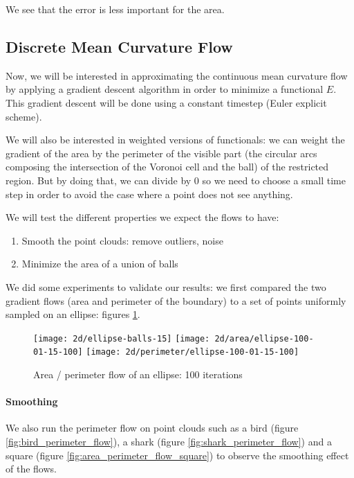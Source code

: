 We see that the error is less important for the area.

\subsection{Discrete Mean Curvature Flow}

Now, we will be interested in approximating the continuous mean curvature flow
by applying a gradient descent algorithm in order to minimize a functional $ E
$. This gradient descent will be done using a constant timestep (Euler explicit
scheme).

We will also be interested in weighted versions of functionals: we can weight
the gradient of the area by the perimeter of the visible part (the circular arcs
composing the intersection of the Voronoi cell and the ball) of the restricted
region. But by doing that, we can divide by $ 0 $ so we need to choose a small
time step in order to avoid the case where a point does not see anything.

We will test the different properties we expect the flows to have:
\begin{enumerate}
    \item Smooth the point clouds: remove outliers, noise
    \item Minimize the area of a union of balls
\end{enumerate}


We did some experiments to validate our results: we first compared the two
gradient flows (area and perimeter of the boundary) to a set of points uniformly
sampled on an ellipse: figures \ref{fig:ellipse_flows}.

\begin{figure}[h]
    \centering

    \texttt{[image: 2d/ellipse-balls-15]}
    \texttt{[image: 2d/area/ellipse-100-01-15-100]}
    \texttt{[image: 2d/perimeter/ellipse-100-01-15-100]}
    \caption{Area / perimeter flow of an ellipse: 100 iterations}
    \label{fig:ellipse_flows}
\end{figure}

\paragraph{Smoothing}

We also run the perimeter flow on point clouds such as a bird (figure
\ref{fig:bird_perimeter_flow}), a shark (figure \ref{fig:shark_perimeter_flow})
and a square (figure \ref{fig:area_perimeter_flow_square}) to observe the
smoothing effect of the flows.

